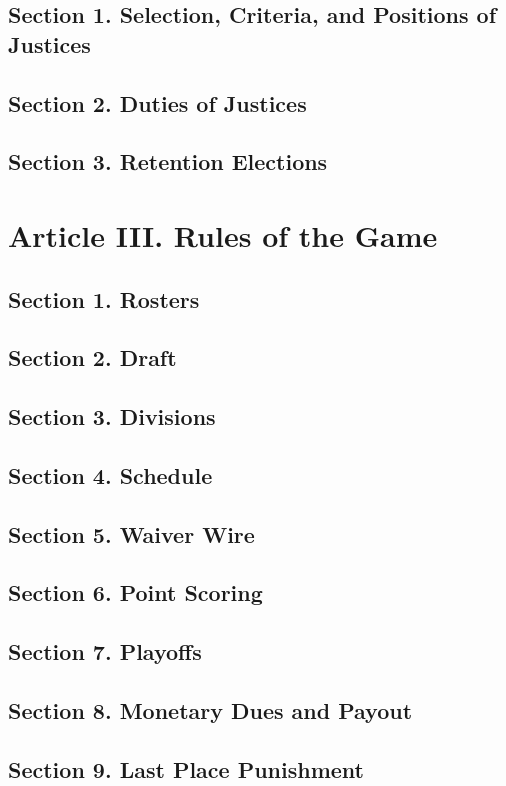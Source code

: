 \documentclass{article}
\begin{document}
	\subsection*{Section 1. Selection, Criteria, and Positions of Justices}
	\subsection*{Section 2. Duties of Justices}
	\subsection*{Section 3. Retention Elections}

\section{Article III. Rules of the Game}
	\subsection*{Section 1. Rosters}
	\subsection*{Section 2. Draft}
	\subsection*{Section 3. Divisions}
	\subsection*{Section 4. Schedule}
	\subsection*{Section 5. Waiver Wire}
	\subsection*{Section 6. Point Scoring}
	\subsection*{Section 7. Playoffs}
	\subsection*{Section 8. Monetary Dues and Payout}
	\subsection*{Section 9. Last Place Punishment}
\end{document}
